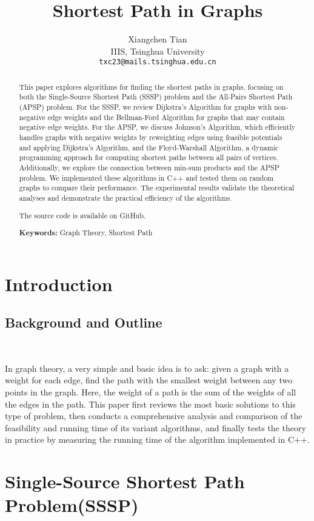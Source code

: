 \documentclass[11pt]{article}
\title{Shortest Path in Graphs}
\author{
    Xiangchen Tian \\
    \fontsize{13}{12}\selectfont
    IIIS, Tsinghua University \\
    \fontsize{13}{12}\selectfont
    \texttt{txc23@mails.tsinghua.edu.cn}
}
\date{}
\theoremstyle{plain}
\begin{document}
\maketitle
\begin{abstract}
  This paper explores algorithms for finding the shortest paths in graphs, focusing on both the 
  Single-Source Shortest Path (SSSP) problem and the All-Pairs Shortest Path (APSP) problem. 
  For the SSSP, we review Dijkstra's Algorithm for graphs with non-negative edge weights and 
  the Bellman-Ford Algorithm for graphs that may contain negative edge weights. For the APSP, 
  we discuss Johnson's Algorithm, which efficiently handles graphs with negative weights by 
  reweighting edges using feasible potentials and applying Dijkstra's Algorithm, and the 
  Floyd-Warshall Algorithm, a dynamic programming approach for computing shortest paths between 
  all pairs of vertices. Additionally, we explore the connection between min-sum products and 
  the APSP problem. We implemented these algorithms in C++ and tested them on random graphs to 
  compare their performance. The experimental results validate the theoretical analyses and 
  demonstrate the practical efficiency of the algorithms. 
  
  The source code is available on GitHub.

    \textbf{Keywords:} Graph Theory, Shortest Path
\end{abstract}

\tableofcontents

\newpage
\section{Introduction}
\subsection{Background and Outline}\

In graph theory, a very simple and basic idea is to ask: given a graph with a weight for each edge, 
find the path with the smallest weight between any two points in the graph. Here, the weight of a 
path is the sum of the weights of all the edges in the path. This paper first reviews the most basic 
solutions to this type of problem, then conducts a comprehensive analysis and comparison of the 
feasibility and running time of its variant algorithms, and finally tests the theory in practice by 
measuring the running time of the algorithm implemented in C++.


\section{Single-Source Shortest Path Problem(SSSP)}
\end{document}
